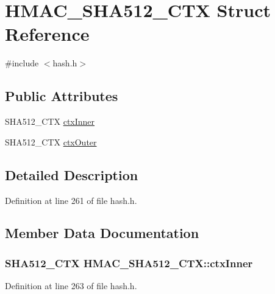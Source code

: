 \hypertarget{struct_h_m_a_c___s_h_a512___c_t_x}{}\section{H\+M\+A\+C\+\_\+\+S\+H\+A512\+\_\+\+C\+T\+X Struct Reference}
\label{struct_h_m_a_c___s_h_a512___c_t_x}


{\ttfamily \#include $<$hash.\+h$>$}

\subsection*{Public Attributes}
\begin{DoxyCompactItemize}
\item 
S\+H\+A512\+\_\+\+C\+T\+X \hyperlink{struct_h_m_a_c___s_h_a512___c_t_x_a3120d5087218a30088b409605ac63afb}{ctx\+Inner}
\item 
S\+H\+A512\+\_\+\+C\+T\+X \hyperlink{struct_h_m_a_c___s_h_a512___c_t_x_aaed38b9a2310e97f4d516b40d7ac2f9f}{ctx\+Outer}
\end{DoxyCompactItemize}


\subsection{Detailed Description}


Definition at line 261 of file hash.\+h.



\subsection{Member Data Documentation}
\hypertarget{struct_h_m_a_c___s_h_a512___c_t_x_a3120d5087218a30088b409605ac63afb}{}
\subsubsection[{ctx\+Inner}]{\setlength{\rightskip}{0pt plus 5cm}S\+H\+A512\+\_\+\+C\+T\+X H\+M\+A\+C\+\_\+\+S\+H\+A512\+\_\+\+C\+T\+X\+::ctx\+Inner}\label{struct_h_m_a_c___s_h_a512___c_t_x_a3120d5087218a30088b409605ac63afb}


Definition at line 263 of file hash.\+h.


